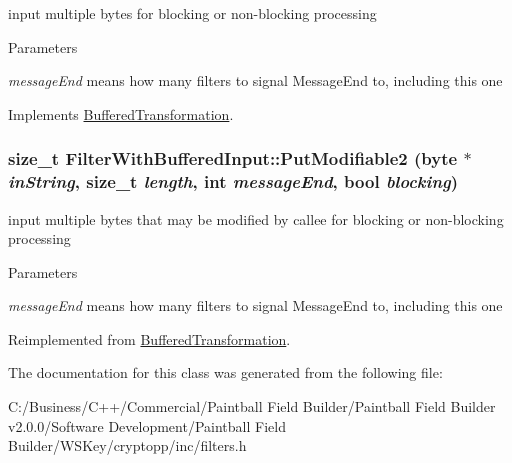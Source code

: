 input multiple bytes for blocking or non-\/blocking processing 
\begin{DoxyParams}{Parameters}
\item[{\em messageEnd}]means how many filters to signal MessageEnd to, including this one \end{DoxyParams}


Implements \hyperlink{class_buffered_transformation_ad396dcb42260f23125a35ec0e5d17d55}{BufferedTransformation}.\hypertarget{class_filter_with_buffered_input_abc7a44af560a17d30a48651683e18e6e}{
\subsubsection[{PutModifiable2}]{\setlength{\rightskip}{0pt plus 5cm}size\_\-t FilterWithBufferedInput::PutModifiable2 (byte $\ast$ {\em inString}, \/  size\_\-t {\em length}, \/  int {\em messageEnd}, \/  bool {\em blocking})}}
\label{class_filter_with_buffered_input_abc7a44af560a17d30a48651683e18e6e}


input multiple bytes that may be modified by callee for blocking or non-\/blocking processing 
\begin{DoxyParams}{Parameters}
\item[{\em messageEnd}]means how many filters to signal MessageEnd to, including this one \end{DoxyParams}


Reimplemented from \hyperlink{class_buffered_transformation_a770bf11f26d4dec66423a7dc2d36843d}{BufferedTransformation}.

The documentation for this class was generated from the following file:\begin{DoxyCompactItemize}
\item 
C:/Business/C++/Commercial/Paintball Field Builder/Paintball Field Builder v2.0.0/Software Development/Paintball Field Builder/WSKey/cryptopp/inc/filters.h\end{DoxyCompactItemize}
